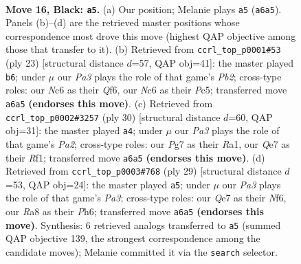 \documentclass[11pt]{article}
\begin{document}
\begin{figure}[p]\centering
\begin{subfigure}{0.46\textwidth}\centering
\resizebox{\linewidth}{!}{%
\newchessgame
\chessboard[
  setfen={r1b1r1k1/1p2qppp/p1n1p3/2Pp4/3P4/P1P2N1P/3QBPP1/R4RK1 b - - 2 16},
  showmover=false,
  pgfstyle=straightmove, color=movearrow, markmove={a6-a5}
]}
\caption{}
\end{subfigure}\hfill
\begin{subfigure}{0.46\textwidth}\centering
\resizebox{\linewidth}{!}{%
\newchessgame
\chessboard[
  setfen={r1b2rk1/pp3pp1/2n1pq1p/2p5/P1BP4/2P1PN2/5PPP/R2Q1RK1 b - - 2 12},
  showmover=false,
  pgfstyle=straightmove, color=movearrow, markmove={b7-b6}
]}
\caption{}
\end{subfigure}
\\[4pt]
\begin{subfigure}{0.46\textwidth}\centering
\resizebox{\linewidth}{!}{%
\newchessgame
\chessboard[
  setfen={r1q2rk1/p1p1bpp1/1p2pn1p/8/3P4/1QBN2P1/PP2PPKP/R4R2 w - - 1 16},
  showmover=false,
  pgfstyle=straightmove, color=movearrow, markmove={a2-a4}
]}
\caption{}
\end{subfigure}\hfill
\begin{subfigure}{0.46\textwidth}\centering
\resizebox{\linewidth}{!}{%
\newchessgame
\chessboard[
  setfen={r1br2k1/5pp1/p1pqpn1p/3p4/2P5/2NBP2P/PP2QPP1/2R2RK1 b - - 4 15},
  showmover=false,
  pgfstyle=straightmove, color=movearrow, markmove={a6-a5}
]}
\caption{}
\end{subfigure}
\caption{\textbf{Move 16, Black: \texttt{a5}.} (a) Our position; Melanie plays \texttt{a5} (\texttt{a6a5}). Panels (b)--(d) are the retrieved master positions whose correspondence most drove this move (highest QAP objective among those that transfer to it). (b) Retrieved from \texttt{ccrl\_top\_p0001\#53} (ply 23) [structural distance $d$=57, QAP obj=41]: the master played \texttt{b6}; under $\mu$ our \emph{Pa3} plays the role of that game's \emph{Pb2}; cross-type roles: our \emph{N}c6 as their \emph{Q}f6, our \emph{N}c6 as their \emph{P}c5; transferred move \texttt{a6a5} \textbf{(endorses this move)}. (c) Retrieved from \texttt{ccrl\_top\_p0002\#3257} (ply 30) [structural distance $d$=60, QAP obj=31]: the master played \texttt{a4}; under $\mu$ our \emph{Pa3} plays the role of that game's \emph{Pa2}; cross-type roles: our \emph{P}g7 as their \emph{R}a1, our \emph{Q}e7 as their \emph{R}f1; transferred move \texttt{a6a5} \textbf{(endorses this move)}. (d) Retrieved from \texttt{ccrl\_top\_p0003\#768} (ply 29) [structural distance $d$=53, QAP obj=24]: the master played \texttt{a5}; under $\mu$ our \emph{Pa3} plays the role of that game's \emph{Pa3}; cross-type roles: our \emph{Q}e7 as their \emph{N}f6, our \emph{R}a8 as their \emph{P}h6; transferred move \texttt{a6a5} \textbf{(endorses this move)}. Synthesis: 6 retrieved analogs transferred to \texttt{a5} (summed QAP objective 139, the strongest correspondence among the candidate moves); Melanie committed it via the \texttt{search} selector.}
\label{fig:thought-m31}
\end{figure}
\end{document}
